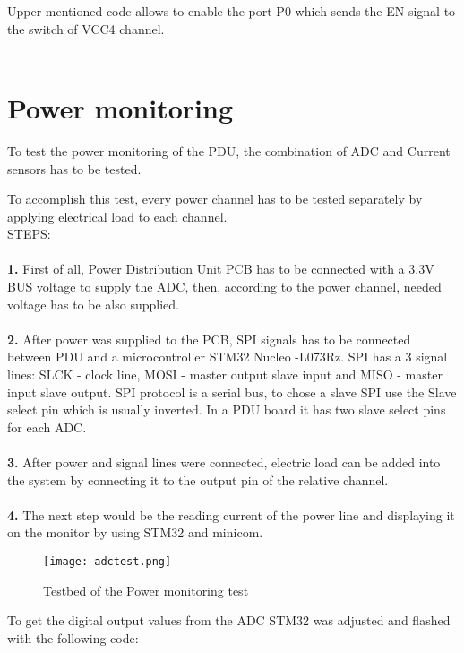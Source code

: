 	Upper mentioned code allows to enable the port P0 which sends the EN signal to the switch of VCC4 channel.\\ \\
	
	
	\section{Power monitoring}
	
	To test the power monitoring of the PDU, the combination of ADC and Current sensors has to be tested. 
	
	To accomplish this test, every power channel has to be tested separately by applying electrical load to each channel. \\
	
	STEPS:\\ \\
	\textbf{1.} First of all, Power Distribution Unit PCB has to be connected with a 3.3V BUS voltage to supply the ADC, then, according to the power channel, needed voltage has to be also supplied. \\ \\
	\textbf{2.} After power  was supplied to the PCB, SPI signals has to be connected between PDU and a microcontroller STM32 Nucleo -L073Rz. SPI has a 3 signal lines: SLCK - clock line, MOSI - master output slave input and MISO - master input slave output. SPI protocol is a serial bus, to chose a slave SPI use the Slave select pin which is usually inverted. In a PDU board it has two slave select pins for each ADC.\\ \\
	\textbf{3.} After power and signal lines were connected, electric load can be added into the system by connecting it to the output pin of the relative channel.\\ \\
	\textbf{4.} The next step would be the reading current of the power line and displaying it on the monitor by using STM32 and minicom.
	  
	\begin{figure}[h]
		\centering
		\texttt{[image: adctest.png]}
		\caption{Testbed of the Power monitoring test}
		\label{fig: adctest}
	\end{figure}
	 
	 To get the digital output values from the ADC STM32 was adjusted and flashed with the following code:
	 
